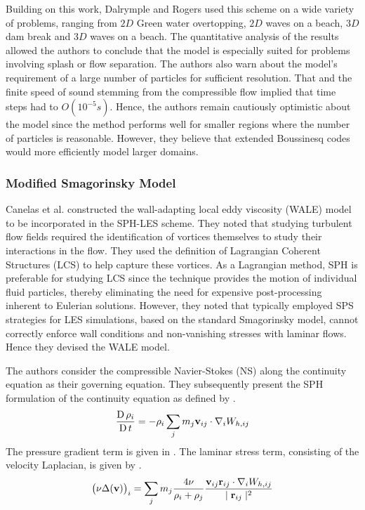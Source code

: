 Building on this work, Dalrymple and Rogers \parencite{Dalrymple2006} used this scheme on a wide variety of problems, ranging from $2D$ Green water overtopping, $2D$ waves on a beach, $3D$ dam break and $3D$ waves on a beach. The quantitative analysis of the results allowed the authors to conclude that the model is especially suited for problems involving splash or flow separation. The authors also warn about the model’s requirement of a large number of particles for sufficient resolution. That and the finite speed of sound stemming from the compressible flow implied that time steps had to $O(10^{-5}s)$. Hence, the authors remain cautiously optimistic about the model since the method performs well for smaller regions where the number of particles is reasonable. However, they believe that extended Boussinesq codes would more efficiently model larger domains.

\subsubsection{Modified Smagorinsky Model}
Canelas et al. \parencite{Canelas2016} constructed the wall-adapting local eddy viscosity (WALE) model to be incorporated in the SPH-LES scheme. They noted that studying turbulent flow fields required the identification of vortices themselves to study their interactions in the flow. They used the definition of Lagrangian Coherent Structures (LCS) to help capture these vortices. As a Lagrangian method, SPH is preferable for studying LCS since the technique provides the motion of individual fluid particles, thereby eliminating the need for expensive post-processing inherent to Eulerian solutions. 
However, they noted that typically employed SPS strategies for LES simulations, based on the standard Smagorinsky model, cannot correctly enforce wall conditions and non-vanishing stresses with laminar flows. Hence they devised the WALE model.

The authors consider the compressible Navier-Stokes (NS) along the continuity equation as their governing equation. They subsequently present the SPH formulation of the continuity equation as defined by .
\begin{equation}
    \frac{\operatorname{D} \rho_i}{\operatorname{D} t} = - \rho_i \sum_j m_j \mathbf{v}_{ij} \cdot \nabla_{i} W_{h, ij}
    \label{eq:Canelas2016-continuity-sph}
\end{equation}
The pressure gradient term is given in . The laminar stress term, consisting of the velocity Laplacian, is given by . 
\begin{equation}
    \big(\nu \Delta(\mathbf{v}) \big)_i = \sum_j m_j \frac{4 \nu}{\rho_i + \rho_j}\frac{\mathbf{v}_{ij} \mathbf{r}_{ij} \cdot \nabla_{i} W_{h, ij}}{\mid \mathbf{r}_{ij} \mid^{2}}
    \label{eq:Canelas2016-vel-laplacian-sph}
\end{equation}

